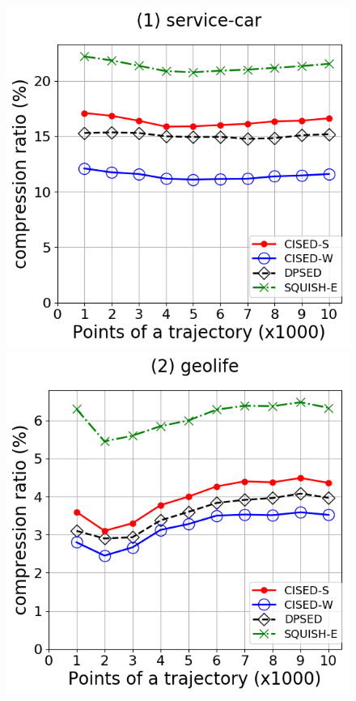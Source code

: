 {\begin{figure}[tb!]
\centering
\includegraphics[scale = 0.2750]{Figures/Exp-CR-size-service.png}\hspace{3ex}
\includegraphics[scale = 0.2750]{Figures/Exp-CR-size-geolife.png}\hspace{3ex}

\end{figure}}
